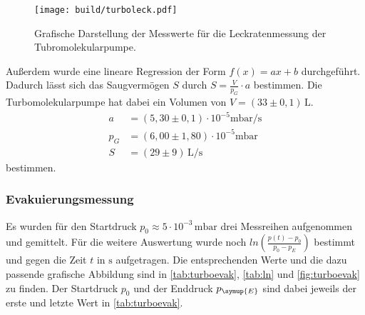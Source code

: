 \begin{figure}[H]
  \centering
  \texttt{[image: build/turboleck.pdf]}
  \caption{Grafische Darstellung der Messwerte für die Leckratenmessung der Tubromolekularpumpe.}
  \label{fig:turboleck}
\end{figure}
Außerdem wurde eine lineare Regression der Form $f(x) = ax +b$ durchgeführt. Dadurch lässt sich das Saugvermögen
$S$ durch $S = \frac{V}{p_G}\cdot a$ bestimmen. Die Turbomolekularpumpe hat dabei ein Volumen von
$V = (33 \pm 0,1) \,\si{\liter}$. 
\begin{align*}
  a &= (5,30 \pm 0,1)\cdot 10^{-5} \si{\milli\bar\per\second} \\
  p_G &= (6,00 \pm 1,80) \cdot 10^{-5} \si{\milli\bar} \\
  S &= (29 \pm 9)\,\si{\liter\per\second}
\end{align*}
bestimmen.

\subsubsection{Evakuierungsmessung}
Es wurden für den Startdruck $p_{0} \approx 5\cdot 10^{-3}\,\si{\milli\bar}$ drei Messreihen aufgenommen und
gemittelt. Für die weitere Auswertung wurde noch $ln(\frac{p(t)-p_0}{p_0 - p_E})$ bestimmt und gegen die Zeit
$t$ in $\si{\second}$ aufgetragen. Die entsprechenden Werte und die dazu passende
grafische Abbildung sind in \autoref{tab:turboevak}, \autoref{tab:ln} und \autoref{fig:turboevak} zu finden. Der
Startdruck $p_{0}$ und der Enddruck $p_{\symup{E}}$ sind dabei jeweils der erste und letzte Wert in
\autoref{tab:turboevak}.


